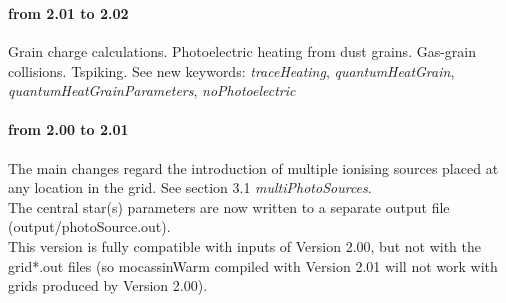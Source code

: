 \documentclass[11pt]{article}
\begin{document}
\pagebreak

\\
\\
\paragraph {from 2.01 to 2.02} Grain charge calculations. Photoelectric heating from dust grains. Gas-grain collisions. Tspiking. 
See new keywords: {\it traceHeating}, {\it quantumHeatGrain}, {\it quantumHeatGrainParameters}, 
{\it noPhotoelectric}
\\
\paragraph {from 2.00 to 2.01} The main changes regard the introduction of multiple ionising sources placed at any 
location in the grid. See section 3.1 {\it multiPhotoSources}. \\
The central star(s) parameters are now written to a separate output file (output/photoSource.out). \\
This version is fully compatible with inputs of Version 2.00, but not with the grid*.out files (so mocassinWarm compiled with Version 2.01 will not work with grids produced by Version 2.00).\\
\end{document}
